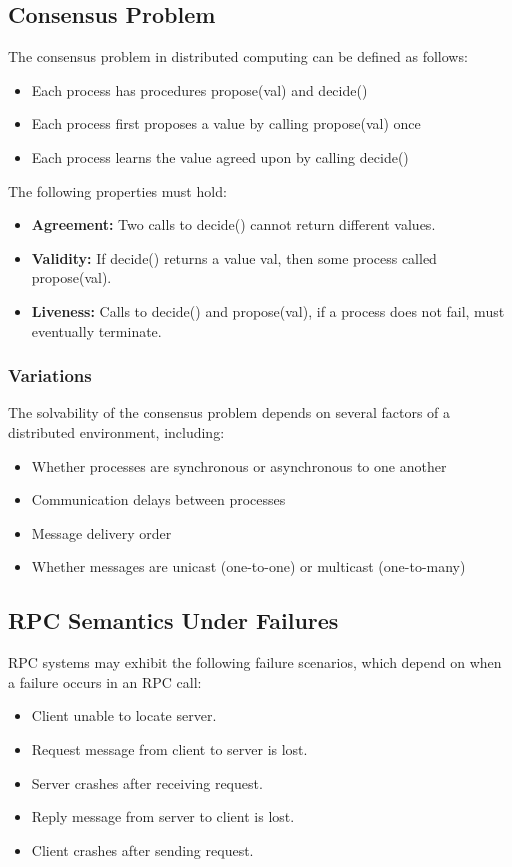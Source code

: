 \documentclass[12pt,titlepage]{article}
\begin{document}
    \subsection{Consensus Problem}
      The consensus problem in distributed computing can be defined as follows:
      \begin{itemize}
        \item Each process has procedures propose(val) and decide()
        \item Each process first proposes a value by calling propose(val) once
        \item Each process learns the value agreed upon by calling decide()
      \end{itemize}

      The following properties must hold:
      \begin{itemize}
        \item \textbf{Agreement:} Two calls to decide() cannot return different values.
        \item \textbf{Validity:} If decide() returns a value val, then some process called propose(val).
        \item \textbf{Liveness:} Calls to decide() and propose(val), if a process does not fail, must eventually terminate.
      \end{itemize}

      \subsubsection{Variations}
        The solvability of the consensus problem depends on several factors of a distributed environment, including:
        \begin{itemize}
          \item Whether processes are synchronous or asynchronous to one another
          \item Communication delays between processes
          \item Message delivery order
          \item Whether messages are unicast (one-to-one) or multicast (one-to-many)
        \end{itemize}

    \subsection{RPC Semantics Under Failures}
      RPC systems may exhibit the following failure scenarios, which depend on when a failure occurs in an RPC call:
      \begin{itemize}
        \item Client unable to locate server.
        \item Request message from client to server is lost.
        \item Server crashes after receiving request.
        \item Reply message from server to client is lost.
        \item Client crashes after sending request.
      \end{itemize}
\end{document}
